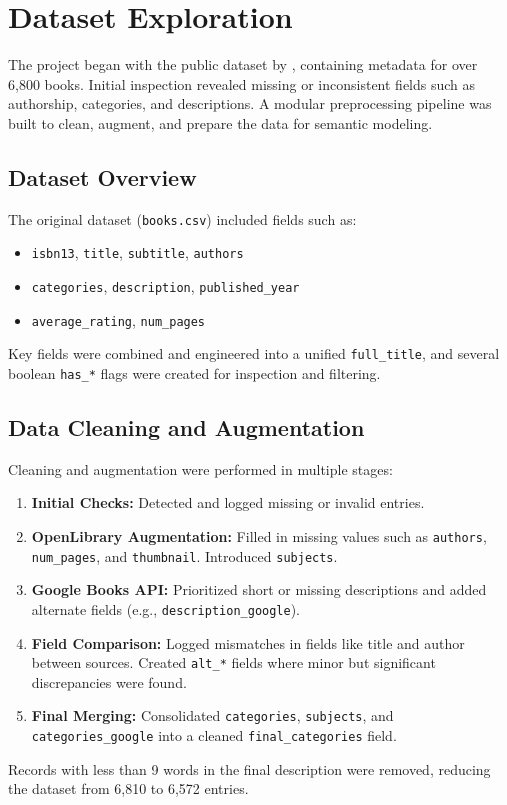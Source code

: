 \chapter{Dataset Exploration}
\label{chapter:dataset}

The project began with the public dataset by \parencite{7k-books}, containing metadata for over 6,800 books. Initial inspection revealed missing or inconsistent fields such as authorship, categories, and descriptions. 
A modular preprocessing pipeline was built to clean, augment, and prepare the data for semantic modeling.

\section{Dataset Overview}
The original dataset (\texttt{books.csv}) included fields such as:
\begin{itemize}
\item \verb|isbn13|, \verb|title|, \verb|subtitle|, \verb|authors|
\item \verb|categories|, \verb|description|, \verb|published_year|
\item \verb|average_rating|, \verb|num_pages|
\end{itemize}
Key fields were combined and engineered into a unified \verb|full_title|, and several boolean \verb|has_*| flags were created for inspection and filtering.

\section{Data Cleaning and Augmentation}
Cleaning and augmentation were performed in multiple stages:
\begin{enumerate}
\item \textbf{Initial Checks:} Detected and logged missing or invalid entries.
\item \textbf{OpenLibrary Augmentation:} Filled in missing values such as \texttt{authors}, \texttt{num\_pages}, and \texttt{thumbnail}. Introduced \texttt{subjects}.
\item \textbf{Google Books API:} Prioritized short or missing descriptions and added alternate fields (e.g., \texttt{description\_google}).
\item \textbf{Field Comparison:} Logged mismatches in fields like title and author between sources. Created \texttt{alt\_*} fields where minor but significant discrepancies were found.
\item \textbf{Final Merging:} Consolidated \texttt{categories}, \texttt{subjects}, and \texttt{categories\_google} into a cleaned \texttt{final\_categories} field.
\end{enumerate}
Records with less than 9 words in the final description were removed, reducing the dataset from 6,810 to 6,572 entries.

